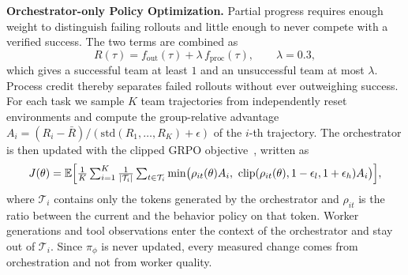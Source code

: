 \textbf{Orchestrator-only Policy Optimization.}\quad
Partial progress requires enough weight to distinguish failing rollouts and little enough to never compete with a verified success.
The two terms are combined as
\begin{equation}
R(\tau)=f_{\mathrm{out}}(\tau)+\lambda\,f_{\mathrm{proc}}(\tau),\qquad \lambda=0.3,
\label{eq:reward}
\end{equation}
which gives a successful team at least $1$ and an unsuccessful team at most $\lambda$.
Process credit thereby separates failed rollouts without ever outweighing success.
For each task we sample $K$ team trajectories from independently reset environments and compute the group-relative advantage $A_i=(R_i-\bar{R})/(\mathrm{std}(R_1,\dots,R_K)+\epsilon)$ of the $i$-th trajectory.
The orchestrator is then updated with the clipped GRPO objective~\citep{shao2024deepseekmath}, written as
\begin{equation}
J(\theta)=\mathbb{E}\Bigl[\tfrac{1}{K}\textstyle\sum_{i=1}^{K}\tfrac{1}{|\mathcal{T}_i|}\sum_{t\in\mathcal{T}_i}\min\bigl(\rho_{it}(\theta)A_i,\ \mathrm{clip}(\rho_{it}(\theta),1-\epsilon_l,1+\epsilon_h)A_i\bigr)\Bigr],
\label{eq:grpo}
\end{equation}
where $\mathcal{T}_i$ contains only the tokens generated by the orchestrator and $\rho_{it}$ is the ratio between the current and the behavior policy on that token.
Worker generations and tool observations enter the context of the orchestrator and stay out of $\mathcal{T}_i$.
Since $\pi_\phi$ is never updated, every measured change comes from orchestration and not from worker quality.
